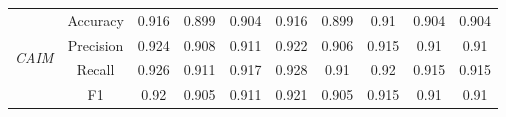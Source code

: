 \begin{table}[H]
\begin{tabular}{|c|c|c|c|c|c|c|c|c|c|}
        \multirow{4}{*}{\textit{CAIM}}  & Accuracy & 0.916 & 0.899 & 0.904 & 0.916 & 0.899 & 0.91 & 0.904 & 0.904 \\ \cline{2-10}
                                         & Precision & 0.924 & 0.908 & 0.911 & 0.922 & 0.906 & 0.915 & 0.91 & 0.91 \\ \cline{2-10}
                                         & Recall & 0.926 & 0.911 & 0.917 & 0.928 & 0.91 & 0.92 & 0.915 & 0.915 \\ \cline{2-10}
                                         & F1 & 0.92 & 0.905 & 0.911 & 0.921 & 0.905 & 0.915 & 0.91 & 0.91 \\ \hline \hline

            \hline
    \end{tabular}
\end{table}
